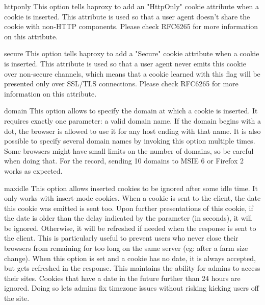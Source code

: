     httponly  This option tells haproxy to add an "HttpOnly" cookie attribute
              when a cookie is inserted. This attribute is used so that a
              user agent doesn't share the cookie with non-HTTP components.
              Please check RFC6265 for more information on this attribute.

    secure    This option tells haproxy to add a "Secure" cookie attribute when
              a cookie is inserted. This attribute is used so that a user agent
              never emits this cookie over non-secure channels, which means
              that a cookie learned with this flag will be presented only over
              SSL/TLS connections. Please check RFC6265 for more information on
              this attribute.

    domain    This option allows to specify the domain at which a cookie is
              inserted. It requires exactly one parameter: a valid domain
              name. If the domain begins with a dot, the browser is allowed to
              use it for any host ending with that name. It is also possible to
              specify several domain names by invoking this option multiple
              times. Some browsers might have small limits on the number of
              domains, so be careful when doing that. For the record, sending
              10 domains to MSIE 6 or Firefox 2 works as expected.

    maxidle   This option allows inserted cookies to be ignored after some idle
              time. It only works with insert-mode cookies. When a cookie is
              sent to the client, the date this cookie was emitted is sent too.
              Upon further presentations of this cookie, if the date is older
              than the delay indicated by the parameter (in seconds), it will
              be ignored. Otherwise, it will be refreshed if needed when the
              response is sent to the client. This is particularly useful to
              prevent users who never close their browsers from remaining for
              too long on the same server (eg: after a farm size change). When
              this option is set and a cookie has no date, it is always
              accepted, but gets refreshed in the response. This maintains the
              ability for admins to access their sites. Cookies that have a
              date in the future further than 24 hours are ignored. Doing so
              lets admins fix timezone issues without risking kicking users off
              the site.

